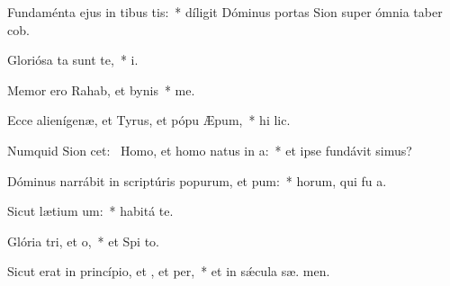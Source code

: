 \item Fundaménta ejus in tibus tis:~* díligit Dóminus portas Sion super ómnia taber cob.
\item Gloriósa ta sunt  te,~*  i.
\item Memor ero Rahab, et bynis~*  me.
\item Ecce alienígenæ, et Tyrus, et pópu Æpum,~* hi  lic.
\item Numquid Sion cet:~\pscross{} Homo, et homo natus  in a:~* et ipse fundávit  simus?
\item Dóminus narrábit in scriptúris popurum, et pum:~* horum, qui fu  a.
\item Sicut lætium um:~* habitá   te.
\item Glória tri, et o,~* et Spi to.
\item Sicut erat in princípio, et , et per,~* et in sǽcula sæ. men.

